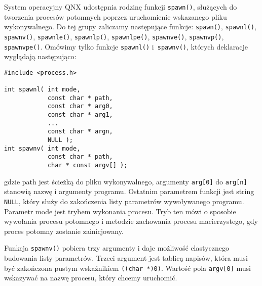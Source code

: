 System operacyjny QNX udostępnia rodzinę funkcji \texttt{spawn()}, służących
do tworzenia procesów potomnych poprzez uruchomienie wskazanego pliku
wykonywalnego. Do tej grupy zaliczamy następujące funkcje: \texttt{spawn()},
\texttt{spawnl()}, \texttt{spawnv()}, \texttt{spawnle()}, \texttt{spawnlp()},
\texttt{spawnlpe()}, \texttt{spawnve()}, \texttt{spawnvp()},
\texttt{spawnvpe()}. Omówimy tylko funkcje \texttt{spawnl()}
i~\texttt{spawnv()}, których deklaracje wyglądają
następująco:

\begin{lstlisting}[style=MyCStyle]
#include <process.h>

int spawnl( int mode,
            const char * path,
            const char * arg0,
            const char * arg1,
            ...
            const char * argn,
            NULL );
int spawnv( int mode,
            const char * path,
            char * const argv[] );
\end{lstlisting}
gdzie path jest ścieżką do pliku wykonywalnego, argumenty \texttt{arg[0]} do
\texttt{arg[n]} stanowią nazwę i argumenty programu. Ostatnim parametrem
funkcji jest string \texttt{NULL}, który służy do zakończenia listy parametrów
wywoływanego programu. Parametr mode jest trybem wykonania procesu. Tryb ten
mówi o sposobie wywołania procesu potomnego i metodzie zachowania procesu
macierzystego, gdy proces potomny zostanie zainicjowany.

Funkcja \texttt{spawnv()} pobiera trzy argumenty i daje możliwość elastycznego
budowania listy parametrów. Trzeci argument jest tablicą napisów, która musi być
zakończona pustym wskaźnikiem \texttt{((char *)0)}. Wartość pola
\texttt{argv[0]} musi wskazywać na nazwę procesu, który chcemy uruchomić.

